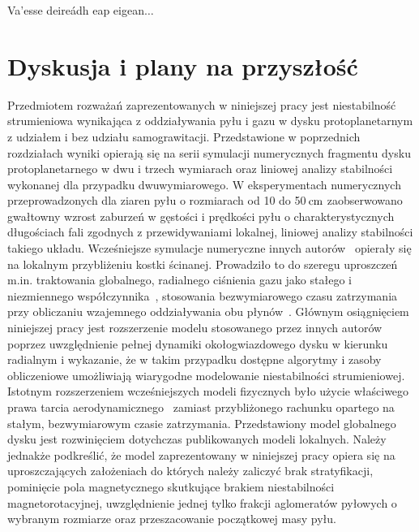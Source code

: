 \begin{savequote}[75mm]
   Va'esse deireádh eap eigean$\ldots$
\end{savequote}

\chapter{Dyskusja i plany na przyszłość}
Przedmiotem rozważań zaprezentowanych w niniejszej pracy jest niestabilność
strumieniowa wynikająca z oddziaływania pyłu i gazu w dysku protoplanetarnym z
udziałem i bez udziału samograwitacji. Przedstawione w poprzednich rozdziałach
wyniki opierają się na serii symulacji numerycznych fragmentu dysku
protoplanetarnego w dwu i trzech wymiarach oraz liniowej analizy stabilności
wykonanej dla przypadku dwuwymiarowego.
%
%
W eksperymentach numerycznych przeprowadzonych dla ziaren pyłu o rozmiarach od
10 do 50$\hbox{$\thinspace\textrm{cm}$}$ zaobserwowano gwałtowny wzrost zaburzeń w gęstości i prędkości
pyłu o charakterystycznych długościach fali zgodnych z przewidywaniami lokalnej,
liniowej analizy stabilności takiego układu. Wcześniejsze symulacje numeryczne
innych autorów~\cite{YG05, JY07, TB09, BS10a, BS10b} opierały się na lokalnym
przybliżeniu kostki ścinanej. Prowadziło to do szeregu uproszczeń m.in.
traktowania globalnego, radialnego ciśnienia gazu jako stałego i niezmiennego
współczynnika~\cite{N86}, stosowania bezwymiarowego czasu zatrzymania przy
obliczaniu wzajemnego oddziaływania obu płynów~\cite{YG05}. Głównym
osiągnięciem niniejszej pracy jest rozszerzenie modelu stosowanego przez innych
autorów poprzez uwzględnienie pełnej dynamiki okołogwiazdowego dysku w kierunku
radialnym i wykazanie, że w takim przypadku dostępne algorytmy i zasoby
obliczeniowe umożliwiają wiarygodne modelowanie niestabilności
strumieniowej. Istotnym rozszerzeniem wcześniejszych modeli fizycznych było 
użycie właściwego prawa tarcia aerodynamicznego~
zamiast przybliżonego rachunku opartego na stałym, bezwymiarowym czasie
zatrzymania. 
%
Przedstawiony model globalnego dysku jest rozwinięciem dotychczas
publikowanych modeli lokalnych. Należy jednakże podkreślić, że model zaprezentowany 
w niniejszej pracy opiera się na uproszczających założeniach do których należy
zaliczyć brak stratyfikacji, pominięcie pola magnetycznego skutkujące
brakiem niestabilności magnetorotacyjnej, uwzględnienie jednej tylko frakcji
aglomeratów pyłowych o wybranym rozmiarze oraz przeszacowanie początkowej masy
pyłu.
%

